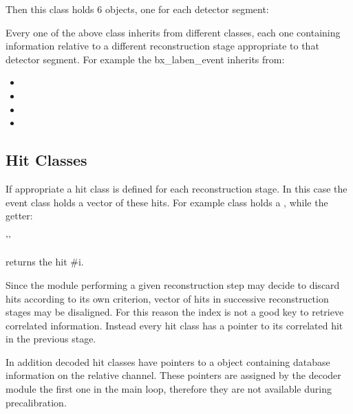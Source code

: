 Then this class holds 6 objects, one for each detector segment:
\ben
\item {}
\item {}
\item {}
\item {}
\item {}
\item {}
\een

Every one of the above class inherits from different classes, each one containing information relative to a different reconstruction stage appropriate to that detector segment.
For example the bx\_laben\_event inherits from:
\begin{itemize}
\item {}
\item {}
\item {}
\item {}
\end{itemize}

\subsection{Hit Classes}
 
If appropriate a hit class is defined for each reconstruction stage.
In this case the event class holds a vector of these hits.
For example class  holds a , while the getter:

'' 

returns the hit \#i.

Since the module performing a given reconstruction step may decide to discard hits according to its own criterion, vector of hits in successive reconstruction stages may be disaligned.
For this reason the index is not a good key to retrieve correlated information. 
Instead every hit class has a pointer to its correlated hit in the previous stage.

In addition decoded hit classes have pointers to a  object containing database information on the relative channel.
These pointers are assigned by the decoder module the first one in the main loop, therefore they are not available during precalibration.

